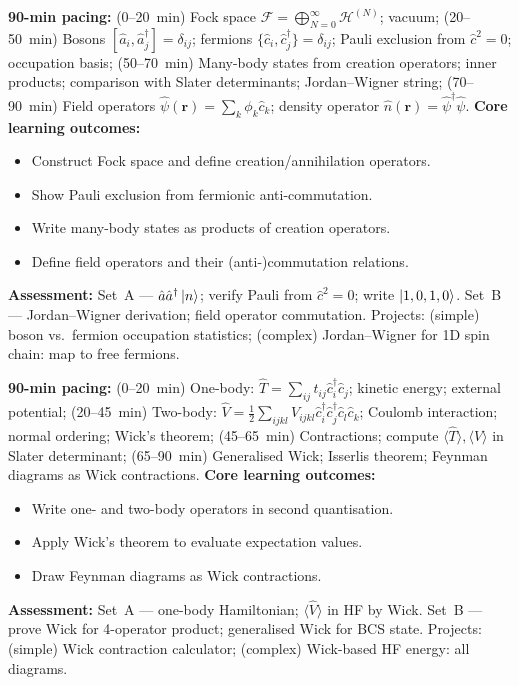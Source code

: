 \documentclass[11pt,a4paper]{article}
\begin{document}
\begin{tcolorbox}[modulebox, title={Module~II.4 --- Lecture L01: Fock Space and Second Quantisation}]
\textbf{90-min pacing:} (0--20~min) Fock space $\mathcal{F}=\bigoplus_{N=0}^\infty\mathcal{H}^{(N)}$; vacuum; (20--50~min) Bosons $[\hat{a}_i,\hat{a}_j^\dagger]=\delta_{ij}$; fermions $\{\hat{c}_i,\hat{c}_j^\dagger\}=\delta_{ij}$; Pauli exclusion from $\hat{c}^2=0$; occupation basis; (50--70~min) Many-body states from creation operators; inner products; comparison with Slater determinants; Jordan--Wigner string; (70--90~min) Field operators $\hat\psi(\mathbf{r})=\sum_k\phi_k\hat{c}_k$; density operator $\hat{n}(\mathbf{r})=\hat\psi^\dagger\hat\psi$.
\medskip\textbf{Core learning outcomes:}
\begin{itemize}[leftmargin=1.4em,topsep=2pt,itemsep=1pt]
  \item Construct Fock space and define creation/annihilation operators.
  \item Show Pauli exclusion from fermionic anti-commutation.
  \item Write many-body states as products of creation operators.
  \item Define field operators and their (anti-)commutation relations.
\end{itemize}
\medskip\textbf{Assessment:}
Set~A --- $\hat{a}\hat{a}^\dagger\ket{n}$; verify Pauli from $\hat{c}^2=0$; write $\ket{1,0,1,0}$.
Set~B --- Jordan--Wigner derivation; field operator commutation.
Projects: (simple) boson vs.\ fermion occupation statistics; (complex) Jordan--Wigner for 1D spin chain: map to free fermions.
\end{tcolorbox}

\medskip

\begin{tcolorbox}[modulebox, title={Module~II.4 --- Lecture L02: Operators in Second Quantisation}]
\textbf{90-min pacing:} (0--20~min) One-body: $\hat{T}=\sum_{ij}t_{ij}\hat{c}_i^\dagger\hat{c}_j$; kinetic energy; external potential; (20--45~min) Two-body: $\hat{V}=\tfrac{1}{2}\sum_{ijkl}V_{ijkl}\hat{c}_i^\dagger\hat{c}_j^\dagger\hat{c}_l\hat{c}_k$; Coulomb interaction; normal ordering; Wick's theorem; (45--65~min) Contractions; compute $\langle\hat{T}\rangle,\langle\hat{V}\rangle$ in Slater determinant; (65--90~min) Generalised Wick; Isserlis theorem; Feynman diagrams as Wick contractions.
\medskip\textbf{Core learning outcomes:}
\begin{itemize}[leftmargin=1.4em,topsep=2pt,itemsep=1pt]
  \item Write one- and two-body operators in second quantisation.
  \item Apply Wick's theorem to evaluate expectation values.
  \item Draw Feynman diagrams as Wick contractions.
\end{itemize}
\medskip\textbf{Assessment:}
Set~A --- one-body Hamiltonian; $\langle\hat{V}\rangle$ in HF by Wick.
Set~B --- prove Wick for 4-operator product; generalised Wick for BCS state.
Projects: (simple) Wick contraction calculator; (complex) Wick-based HF energy: all diagrams.
\end{tcolorbox}
\end{document}
